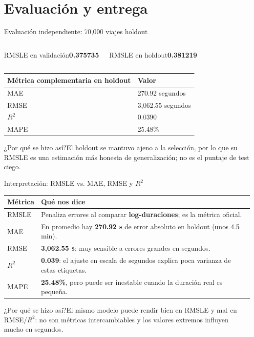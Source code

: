 \documentclass[aspectratio=169,11pt]{beamer}
\newcommand{\porq}[1]{\vspace{1.2mm}\begin{block}{¿Por qué se hizo así?}\small #1\end{block}}
\newcommand{\dato}[2]{\begin{block}{#1}\centering\Large\textbf{#2}\end{block}}
\begin{document}
\section{Evaluación y entrega}
\begin{frame}{Evaluación independiente: 70,000 viajes holdout}
\begin{columns}[T]
\dato{RMSLE en validación}{0.375735}
\dato{RMSLE en holdout}{0.381219}
\end{columns}
\vspace{2mm}
\begin{center}
\small
\begin{tabular}{ll}
\toprule\textbf{Métrica complementaria en holdout} & \textbf{Valor}\\\midrule
MAE & 270.92 segundos\\
RMSE & 3,062.55 segundos\\
$R^2$ & 0.0390\\
MAPE & 25.48\%\\\bottomrule
\end{tabular}
\end{center}
\porq{El holdout se mantuvo ajeno a la selección, por lo que su RMSLE es una estimación más honesta de generalización; no es el puntaje de test ciego.}
\end{frame}

\begin{frame}{Interpretación: RMSLE vs. MAE, RMSE y $R^2$}
\small
\begin{tabular}{p{.19\linewidth}p{.71\linewidth}}
\toprule
\textbf{Métrica} & \textbf{Qué nos dice}\tabularnewline\midrule
RMSLE & Penaliza errores al comparar \textbf{log-duraciones}; es la métrica oficial.\\
MAE & En promedio hay \textbf{270.92 s} de error absoluto en holdout (unos 4.5 min).\\
RMSE & \textbf{3,062.55 s}; muy sensible a errores grandes en segundos.\\
$R^2$ & \textbf{0.039}: el ajuste en escala de segundos explica poca varianza de estas etiquetas.\\
MAPE & \textbf{25.48\%}, pero puede ser inestable cuando la duración real es pequeña.\\
\bottomrule
\end{tabular}
\porq{El mismo modelo puede rendir bien en RMSLE y mal en RMSE/$R^2$: no son métricas intercambiables y los valores extremos influyen mucho en segundos.}
\end{frame}
\end{document}
